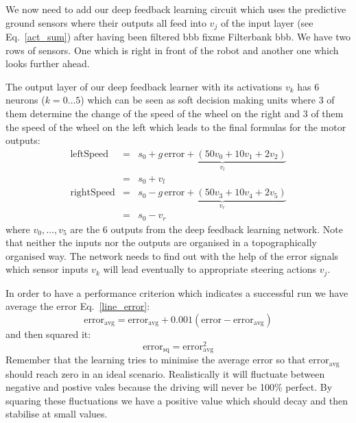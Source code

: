 \documentclass{llncs}
\begin{document}
We now need to add our deep feedback learning circuit which uses the
predictive ground sensors where their outputs all feed into $v_j$ of
the input layer (see Eq.~\ref{act_sum}) after having been filtered bbb
fixme Filterbank bbb. We have two rows of sensors. One which is right
in front of the robot and another one which looks further ahead.

The output layer of our deep feedback learner with its activations
$v_k$ has 6 neurons ($k=0 \ldots 5$) which can be seen as soft
decision making units where 3 of them determine the change of the speed of
the wheel on the right and 3 of them the speed of the wheel on the
left which leads to the final formulas for the motor outputs:
\begin{eqnarray}
  \mathrm{leftSpeed} &=& s_0 + \underbrace{g\, \mathrm{error} + \left( 50 v_0 + 10 v_1 + 2 v_2 \right)}_{v_l} \\
                     &=& s_0 + v_l \\
  \mathrm{rightSpeed} &=& s_0 - \underbrace{g\, \mathrm{error} + \left( 50 v_3 + 10 v_4 + 2 v_5 \right)}_{v_r} \\
                     &=& s_0 - v_r
\end{eqnarray}
where $v_0, \ldots, v_5$ are the 6 outputs from the deep feedback learning network.
Note that neither the inputs nor the outputs are organised in a topographically
organised way. The network needs to find out with the help of the error signals
which sensor inputs $v_k$ will lead eventually to appropriate steering actions $v_j$.

In order to have a performance criterion which indicates a successful
run we have average the error Eq.~\ref{line_error}:
\begin{equation}
  \mathrm{error}_\mathrm{avg} =  \mathrm{error}_\mathrm{avg} + 0.001 (\mathrm{error} - \mathrm{error}_\mathrm{avg}) 
\end{equation}
and then squared it:
\begin{equation}
  \mathrm{error}_\mathrm{sq} =  \mathrm{error}_\mathrm{avg}^2 \label{line_sqerr}
\end{equation}
Remember that the learning tries to minimise the average error so that $\mathrm{error}_\mathrm{avg}$
should reach zero in an ideal scenario. Realistically it will fluctuate between negative and
postive vales because the driving will never be 100\% perfect. By squaring these fluctuations
we have a positive value which should decay and then stabilise at small values.
\end{document}
